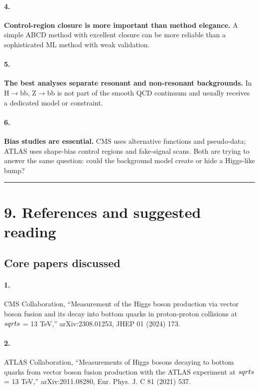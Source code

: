\documentclass[11pt]{article}
\begin{document}
\paragraph{4.} \textbf{Control-region closure is more important than method elegance.} A simple ABCD method with excellent closure can be more reliable than a sophisticated ML method with weak validation.

\paragraph{5.} \textbf{The best analyses separate resonant and non-resonant backgrounds.} In H$\to$bb, Z$\to$bb is not part of the smooth QCD continuum and usually receives a dedicated model or constraint.

\paragraph{6.} \textbf{Bias studies are essential.} CMS uses alternative functions and pseudo-data; ATLAS uses shape-bias control regions and fake-signal scans. Both are trying to answer the same question: could the background model create or hide a Higgs-like bump?

\bigskip\hrule\bigskip

\section{9. References and suggested reading}

\subsection{Core papers discussed}

\paragraph{1.} CMS Collaboration, ``Measurement of the Higgs boson production via vector boson fusion and its decay into bottom quarks in proton-proton collisions at $\\sqrt{s}$ = 13 TeV,'' arXiv:2308.01253, JHEP 01 (2024) 173.
\paragraph{2.} ATLAS Collaboration, ``Measurements of Higgs bosons decaying to bottom quarks from vector boson fusion production with the ATLAS experiment at $\\sqrt{s}$ = 13 TeV,'' arXiv:2011.08280, Eur. Phys. J. C 81 (2021) 537.
\end{document}
